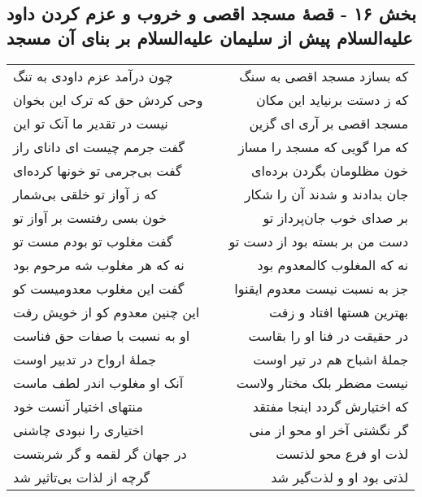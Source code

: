 \begin{center}
\section*{بخش ۱۶ - قصهٔ مسجد اقصی و خروب و عزم کردن داود علیه‌السلام پیش از سلیمان علیه‌السلام بر بنای آن مسجد}
\label{sec:sh016}
\begin{longtable}{l p{0.5cm} r}
چون درآمد عزم داودی به تنگ
&&
که بسازد مسجد اقصی به سنگ
\\
وحی کردش حق که ترک این بخوان
&&
که ز دستت برنیاید این مکان
\\
نیست در تقدیر ما آنک تو این
&&
مسجد اقصی بر آری ای گزین
\\
گفت جرمم چیست ای دانای راز
&&
که مرا گویی که مسجد را مساز
\\
گفت بی‌جرمی تو خونها کرده‌ای
&&
خون مظلومان بگردن برده‌ای
\\
که ز آواز تو خلقی بی‌شمار
&&
جان بدادند و شدند آن را شکار
\\
خون بسی رفتست بر آواز تو
&&
بر صدای خوب جان‌پرداز تو
\\
گفت مغلوب تو بودم مست تو
&&
دست من بر بسته بود از دست تو
\\
نه که هر مغلوب شه مرحوم بود
&&
نه که المغلوب کالمعدوم بود
\\
گفت این مغلوب معدومیست کو
&&
جز به نسبت نیست معدوم ایقنوا
\\
این چنین معدوم کو از خویش رفت
&&
بهترین هستها افتاد و زفت
\\
او به نسبت با صفات حق فناست
&&
در حقیقت در فنا او را بقاست
\\
جملهٔ ارواح در تدبیر اوست
&&
جملهٔ اشباح هم در تیر اوست
\\
آنک او مغلوب اندر لطف ماست
&&
نیست مضطر بلک مختار ولاست
\\
منتهای اختیار آنست خود
&&
که اختیارش گردد اینجا مفتقد
\\
اختیاری را نبودی چاشنی
&&
گر نگشتی آخر او محو از منی
\\
در جهان گر لقمه و گر شربتست
&&
لذت او فرع محو لذتست
\\
گرچه از لذات بی‌تاثیر شد
&&
لذتی بود او و لذت‌گیر شد
\\
\end{longtable}
\end{center}
